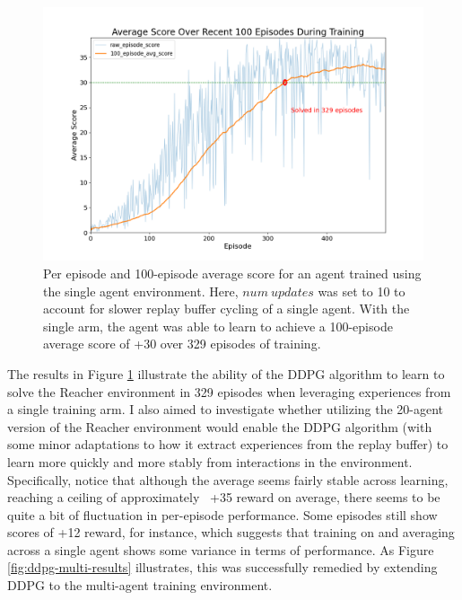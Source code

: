 \documentclass[11pt]{article}
\begin{document}
\FloatBarrier

\begin{figure}[!ht]
	\centering
	\includegraphics[width=0.75\linewidth]{images/ddpg-single-results.png}
	\caption{Per episode and 100-episode average score for an agent trained using the single agent environment. Here, $num\ updates$ was set to 10 to account for slower replay buffer cycling of a single agent. With the single arm, the agent was able to learn to achieve a 100-episode average score of +30 over 329 episodes of training.}
	\label{fig:ddpg-single-results}
\end{figure}

\FloatBarrier

The results in Figure \ref{fig:ddpg-single-results} illustrate the ability of the DDPG algorithm to learn to solve the Reacher environment in 329 episodes when leveraging experiences from a single training arm. I also aimed to investigate whether utilizing the 20-agent version of the Reacher environment would enable the DDPG algorithm (with some minor adaptations to how it extract experiences from the replay buffer) to learn more quickly and more stably from interactions in the environment. Specifically, notice that although the average seems fairly stable across learning, reaching a ceiling of approximately ~+35 reward on average, there seems to be quite a bit of fluctuation in per-episode performance. Some episodes still show scores of +12 reward, for instance, which suggests that training on and averaging across a single agent shows some variance in terms of performance. As Figure \ref{fig:ddpg-multi-results} illustrates, this was successfully remedied by extending DDPG to the multi-agent training environment.

\FloatBarrier
\end{document}

